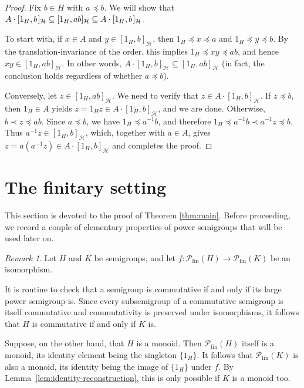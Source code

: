 \documentclass[11pt,reqno]{amsart}
\theoremstyle{definition}
\theoremstyle{remark}
\newtheorem{remark}[theorem]{Remark}
\theoremstyle{theoremdd}
\newcommand{\fin}{\mathrm{fin}}
\renewcommand{\,}{\kern 0.1em}
\begin{document}
\begin{proof}
Fix $b \in H$ with $a \preceq b$. We will show that $A \cdot [1_H, b\,]_\mathcal{H} \subseteq [1_H, ab]_\mathcal{H} \subseteq A \cdot [1_H, b\,]_\mathcal{H}$.


To start with, if $x \in A$ and $y \in [1_H, b]_\mathcal{H}$, then $1_H \preceq x \preceq a$ and $1_H \preceq y \preceq b$. By the
translation-invariance of the order, this implies $1_H \preceq xy \preceq ab$, and hence $xy \in [1_H, ab]_\mathcal{H}$. In other words, $A \cdot [1_H, b]_\mathcal{H} \subseteq [1_H, ab]_\mathcal{H}$ (in fact, the conclusion holds regardless of whether $a \preceq b$). 

Conversely, let $z \in [1_H, ab]_\mathcal{H}$. We need to verify that $z \in A \cdot [1_H, b]_\mathcal{H}$. 
If $z \preceq b$, then 
$1_H \in A$ yields $z = 1_H z \in A \cdot [1_H,b]_\mathcal{H}$, and we are done.
Otherwise, $b \prec z \preceq ab$. Since $a \preceq b$, we have $1_H \preceq \allowbreak a^{-1}b$, and therefore $1_H \preceq a^{-1}b \prec a^{-1}z \preceq b$.
Thus $a^{-1}z \in [1_H,b]_\mathcal{H}$, which, together with $a \in A$, gives $z = a(a^{-1}z) \in A \cdot [1_H,b]_\mathcal{H}$ and completes the proof.
\end{proof}
\section{The finitary setting}
\label{sect:4}



This section is devoted to the proof of Theorem \ref{thm:main}. Before proceeding, we record a couple of elementary properties of power semigroups that will be used later on.

\begin{remark}
\label{rem:commutativity-and-unity-are-preserved}
Let $H$ and $K$ be semigroups, and let $f \colon \mathcal{P}_{\fin}(H) \to 
\mathcal{P}_{\fin}(K)$ be an isomorphism.

It is routine to check that a 
semigroup is commutative if and only if its large power semigroup is. 
Since every subsemigroup of a commutative semigroup is itself commutative and commutativity is preserved under isomorphisms, it follows that $H$ is commutative if and only if $K$ is.

Suppose, on the other hand, that $H$ is a monoid. Then $\mathcal P_\fin(H)$ 
itself is a monoid, its identity element being the singleton $\{1_H\}$. 
It follows that $\mathcal P_\fin(K)$ is also a monoid, its identity 
being the image of $\{1_H\}$ under $f$. By Lemma~\ref{lem:identity-reconstruction}, this is only possible if $K$ is a monoid too.
\end{remark}
\end{document}
